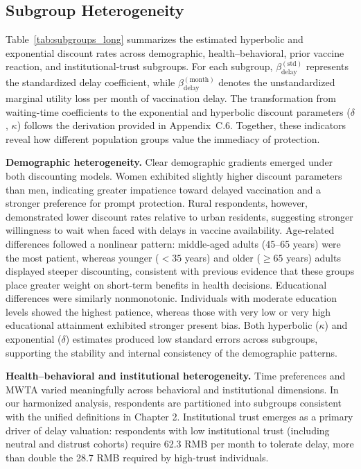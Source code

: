 \documentclass[preprint,12pt]{elsarticle}
\begin{document}
\clearpage

\subsection{Subgroup Heterogeneity}

Table~\ref{tab:subgroups_long} summarizes the estimated hyperbolic and exponential discount rates across
demographic, health–behavioral, prior vaccine reaction, and institutional‐trust subgroups.
For each subgroup, $\beta_{\text{delay}}^{(\mathrm{std})}$ represents the standardized delay coefficient, while
$\beta_{\text{delay}}^{(\mathrm{month})}$ denotes the unstandardized marginal utility loss per month of vaccination
delay. The transformation from waiting-time coefficients to the exponential and hyperbolic discount 
parameters ($\delta$, $\kappa$) follows the derivation provided in Appendix~C.6.
Together, these indicators reveal how different population groups value the immediacy
of protection.


\noindent\textbf{Demographic heterogeneity.}
Clear demographic gradients emerged under both discounting models. Women exhibited
slightly higher discount parameters than men, indicating greater impatience toward delayed
vaccination and a stronger preference for prompt protection. Rural respondents,
however, demonstrated lower discount rates relative to urban residents, suggesting stronger
willingness to wait when faced with delays in vaccine availability. Age‐related differences
followed a nonlinear pattern: middle‐aged adults (45–65 years) were the most patient, whereas
younger ($<35$ years) and older ($\geq 65$ years) adults displayed steeper discounting,
consistent with previous evidence that these groups place greater weight on short‐term
benefits in health decisions. Educational differences were similarly nonmonotonic.
Individuals with moderate education levels showed the highest patience, whereas those with
very low or very high educational attainment exhibited stronger present bias. Both hyperbolic
($\kappa$) and exponential ($\delta$) estimates produced low standard errors across subgroups,
supporting the stability and internal consistency of the demographic patterns.

\noindent\textbf{Health--behavioral and institutional heterogeneity.}
Time preferences and MWTA varied meaningfully across behavioral and institutional dimensions.
In our harmonized analysis, respondents are partitioned into subgroups consistent with the unified definitions in Chapter 2.
Institutional trust emerges as a primary driver of delay valuation: respondents with low institutional trust (including neutral and distrust cohorts) require 62.3 RMB per month to tolerate delay, more than double the 28.7 RMB required by high-trust individuals. 
\end{document}
